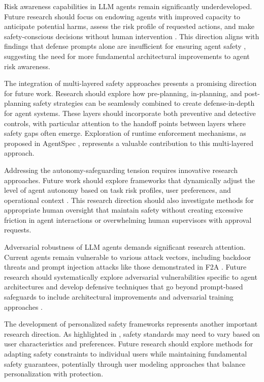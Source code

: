 \documentclass[conference]{IEEEtran}
\begin{document}
Risk awareness capabilities in LLM agents remain significantly underdeveloped. Future research should focus on endowing agents with improved capacity to anticipate potential harms, assess the risk profile of requested actions, and make safety-conscious decisions without human intervention \cite{2401.10019}. This direction aligns with findings that defense prompts alone are insufficient for ensuring agent safety \cite{2412.14470}, suggesting the need for more fundamental architectural improvements to agent risk awareness.

The integration of multi-layered safety approaches presents a promising direction for future work. Research should explore how pre-planning, in-planning, and post-planning safety strategies \cite{2402.01586} can be seamlessly combined to create defense-in-depth for agent systems. These layers should incorporate both preventive and detective controls, with particular attention to the handoff points between layers where safety gaps often emerge. Exploration of runtime enforcement mechanisms, as proposed in AgentSpec \cite{2503.18666}, represents a valuable contribution to this multi-layered approach.

Addressing the autonomy-safeguarding tension requires innovative research approaches. Future work should explore frameworks that dynamically adjust the level of agent autonomy based on task risk profiles, user preferences, and operational context \cite{2502.11448}. This research direction should also investigate methods for appropriate human oversight that maintain safety without creating excessive friction in agent interactions or overwhelming human supervisors with approval requests.

Adversarial robustness of LLM agents demands significant research attention. Current agents remain vulnerable to various attack vectors, including backdoor threats \cite{2402.11208} and prompt injection attacks like those demonstrated in F2A \cite{2410.08776}. Future research should systematically explore adversarial vulnerabilities specific to agent architectures and develop defensive techniques that go beyond prompt-based safeguards to include architectural improvements and adversarial training approaches \cite{2407.01850}.

The development of personalized safety frameworks represents another important research direction. As highlighted in \cite{2502.15086}, safety standards may need to vary based on user characteristics and preferences. Future research should explore methods for adapting safety constraints to individual users while maintaining fundamental safety guarantees, potentially through user modeling approaches that balance personalization with protection.
\end{document}
